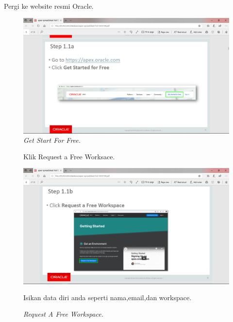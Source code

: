 \begin{enumerate}
\item[1]Pergi ke website resmi Oracle.

\begin{figure}[!htbp]
    \begin{center}
    \includegraphics[scale=0.2]{figures/pic(1).png}
    \caption{\textit{Get Start For Free.}}
    \end{center}   
    \end{figure}
    
\begin{figure}[!htbp]
\item[2]Klik Request a Free Worksace.

    \begin{center}
    \includegraphics[scale=0.2]{figures/pic(2).png}
    \caption{\textit{Request A Free Workspace.}}
    \end{center}

\item[3]Isikan data diri anda seperti nama,email,dan workspace.

   
        

\end{figure}
\end{enumerate}
